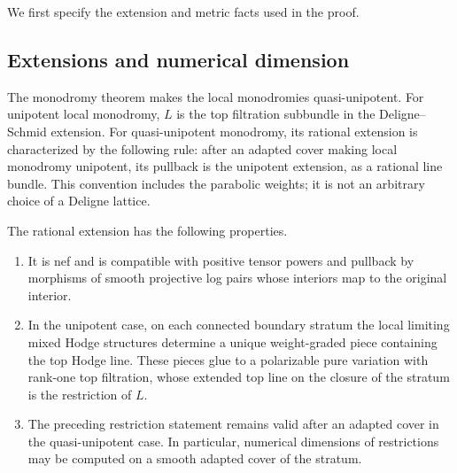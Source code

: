 We first specify the extension and metric facts used in the proof.

\subsection{Extensions and numerical dimension}

The monodromy theorem makes the local monodromies quasi-unipotent.
For unipotent local monodromy, $L$ is the top filtration subbundle in the
Deligne--Schmid extension.  For quasi-unipotent monodromy, its rational
extension is characterized by the following rule: after an adapted cover
making local monodromy unipotent, its pullback is the unipotent extension,
as a rational line bundle.  This convention includes the parabolic
weights; it is not an arbitrary choice of a Deligne lattice.

\begin{lemma}\label{p1logalt:extensions}
The rational extension has the following properties.
\begin{enumerate}[label=\textup{(\roman*)}]
\item It is nef and is compatible with positive tensor powers and
pullback by morphisms of smooth projective log pairs whose interiors map
to the original interior.
\item In the unipotent case, on each connected boundary stratum the local
limiting mixed Hodge structures determine a unique weight-graded piece
containing the top Hodge line.  These pieces glue to a polarizable pure
variation with rank-one top filtration, whose extended top line on the
closure of the stratum is the restriction of $L$.
\item The preceding restriction statement remains valid after an adapted
cover in the quasi-unipotent case.  In particular, numerical dimensions
of restrictions may be computed on a smooth adapted cover of the
stratum.
\end{enumerate}
\end{lemma}


